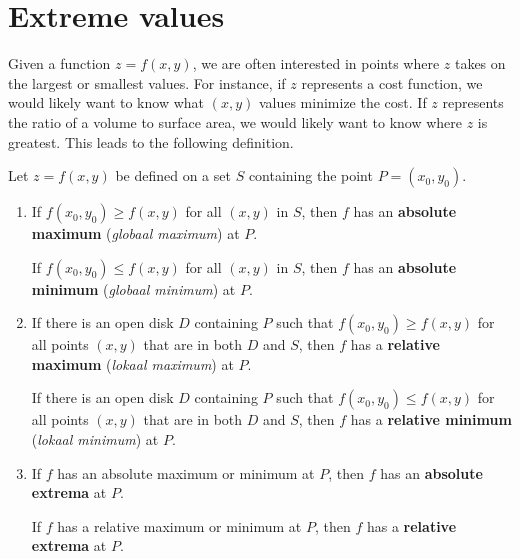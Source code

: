 \fi

\ifanalysis

\section{Extreme values}
\label{ERD}
Given a function $z=f(x,y)$, we are often interested in points where $z$ takes on the largest or smallest values. For instance, if $z$ represents a cost function, we would likely want to know what $(x,y)$ values minimize the cost. If $z$ represents the ratio of a volume to surface area, we would likely want to know where $z$ is greatest. This leads to the following definition.

\begin{definition}\label{def:multi_extrema}
Let $z=f(x,y)$ be defined on a set $S$ containing the point $P=(x_0,y_0)$.
\begin{enumerate}
	\item	If $f(x_0,y_0)\geq f(x,y)$ for all $(x,y)$ in $S$, then $f$ has an \textbf{absolute maximum} (\textit{globaal maximum}) at $P$.
	
	If $f(x_0,y_0)\leq f(x,y)$ for all $(x,y)$ in $S$, then $f$ has an \textbf{absolute minimum} (\textit{globaal minimum}) at $P$.
	
	\item If there is an open disk $D$ containing $P$ such that $f(x_0,y_0) \geq f(x,y)$ for all points $(x,y)$ that are in both $D$ and $S$, then $f$ has a \textbf{relative maximum} (\textit{lokaal maximum}) at $P$.
	
	If there is an open disk $D$ containing $P$ such that $f(x_0,y_0) \leq f(x,y)$ for all points $(x,y)$ that are in both $D$ and $S$, then $f$ has a \textbf{relative minimum} (\textit{lokaal minimum}) at $P$.
	
	
	\item		If $f$ has an absolute maximum or minimum at $P$, then $f$ has an \textbf{absolute extrema} at $P$.
	
	If $f$ has a relative maximum or minimum at $P$, then $f$ has a \textbf{relative extrema} at $P$.
	
	
\end{enumerate}
\end{definition}

